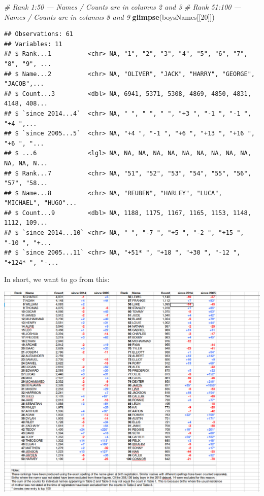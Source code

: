 \documentclass[]{book}
\newenvironment{Shaded}{\begin{snugshade}}{\end{snugshade}}
\newcommand{\CommentTok}[1]{\textcolor[rgb]{0.56,0.35,0.01}{\textit{#1}}}
\newcommand{\DecValTok}[1]{\textcolor[rgb]{0.00,0.00,0.81}{#1}}
\newcommand{\KeywordTok}[1]{\textcolor[rgb]{0.13,0.29,0.53}{\textbf{#1}}}
\newcommand{\NormalTok}[1]{#1}
\begin{document}
\begin{Shaded}
\begin{Highlighting}[]
\CommentTok{# Rank 1:50 --- Names / Counts are in columns 2 and 3 }
\CommentTok{# Rank 51:100 --- Names / Counts are in columns 8 and 9}
\KeywordTok{glimpse}\NormalTok{(boysNames[[}\DecValTok{20}\NormalTok{]]) }
\end{Highlighting}
\end{Shaded}

\begin{verbatim}
## Observations: 61
## Variables: 11
## $ Rank...1          <chr> NA, "1", "2", "3", "4", "5", "6", "7", "8", "9", ...
## $ Name...2          <chr> NA, "OLIVER", "JACK", "HARRY", "GEORGE", "JACOB",...
## $ Count...3         <dbl> NA, 6941, 5371, 5308, 4869, 4850, 4831, 4148, 408...
## $ `since 2014...4`  <chr> NA, "­ ", "­ ", "­ ", "+3 ", "-1 ", "-1 ", "+4 ",...
## $ `since 2005...5`  <chr> NA, "+4 ", "-1 ", "+6 ", "+13 ", "+16 ", "+6 ", "...
## $ ...6              <lgl> NA, NA, NA, NA, NA, NA, NA, NA, NA, NA, NA, NA, N...
## $ Rank...7          <chr> NA, "51", "52", "53", "54", "55", "56", "57", "58...
## $ Name...8          <chr> NA, "REUBEN", "HARLEY", "LUCA", "MICHAEL", "HUGO"...
## $ Count...9         <dbl> NA, 1188, 1175, 1167, 1165, 1153, 1148, 1112, 109...
## $ `since 2014...10` <chr> NA, "­ ", "-7 ", "+5 ", "-2 ", "+15 ", "-10 ", "+...
## $ `since 2005...11` <chr> NA, "+51* ", "+18 ", "+30 ", "-12 ", "+124* ", "-...
\end{verbatim}

In short, we want to go from this:

\includegraphics{R/RDataWrangling/images/messy.png}
\end{document}
